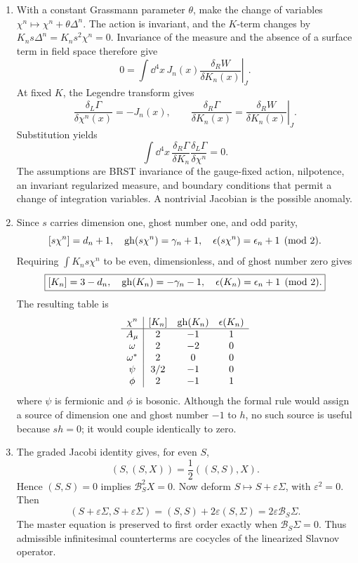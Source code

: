 
\begin{enumerate}
  \begin{enumerate}
    \item[(a)]
    With a constant Grassmann parameter \(\theta\), make the change of
    variables
    \(\chi^n\mapsto\chi^n+\theta\Delta^n\).  The action is invariant,
    and the \(K\)-term changes by
    \(K_n s\Delta^n=K_ns^2\chi^n=0\).  Invariance of the measure and the
    absence of a surface term in field space therefore give
    \[
      0=\int \dd^4x\,J_n(x)
        \left.\frac{\delta_R W}{\delta K_n(x)}\right|_J .
    \]
    At fixed \(K\), the Legendre transform gives
    \[
      \frac{\delta_L\Gamma}{\delta\chi^n(x)}=-J_n(x),
      \qquad
      \frac{\delta_R\Gamma}{\delta K_n(x)}
        =\left.\frac{\delta_R W}{\delta K_n(x)}\right|_J .
    \]
    Substitution yields
    \[
      \boxed{\int \dd^4x\,
        \frac{\delta_R\Gamma}{\delta K_n}
        \frac{\delta_L\Gamma}{\delta\chi^n}=0.}
    \]
    The assumptions are BRST invariance of the gauge-fixed action,
    nilpotence, an invariant regularized measure, and boundary conditions
    that permit a change of integration variables.  A nontrivial Jacobian
    is the possible anomaly.
    \item[(b)]
    Since \(s\) carries dimension one, ghost number one, and odd parity,
    \[
      [s\chi^n]=d_n+1,\quad
      {\rm gh}(s\chi^n)=\gamma_n+1,\quad
      \epsilon(s\chi^n)=\epsilon_n+1\pmod2 .
    \]
    Requiring \(\int K_ns\chi^n\) to be even, dimensionless, and of ghost
    number zero gives
    \[
      \boxed{[K_n]=3-d_n,\quad
      {\rm gh}(K_n)=-\gamma_n-1,\quad
      \epsilon(K_n)=\epsilon_n+1\pmod2 .}
    \]
    The resulting table is
    \[
    \begin{array}{c|ccc}
      \chi^n&[K_n]&{\rm gh}(K_n)&\epsilon(K_n)\\ \hline
      A_\mu&2&-1&1\\
      \omega&2&-2&0\\
      \omega^*&2&0&0\\
      \psi&3/2&-1&0\\
      \phi&2&-1&1
    \end{array}
    \]
    where \(\psi\) is fermionic and \(\phi\) is bosonic.  Although the
    formal rule would assign a source of dimension one and ghost number
    \(-1\) to \(h\), no such source is useful because \(sh=0\); it would
    couple identically to zero.
    \item[(c)]
    The graded Jacobi identity gives, for even \(S\),
    \[
      (S,(S,X))=\frac12((S,S),X).
    \]
    Hence \((S,S)=0\) implies
    \(\mathcal B_S^2X=0\).  Now deform
    \(S\mapsto S+\varepsilon\Sigma\), with \(\varepsilon^2=0\).  Then
    \[
      (S+\varepsilon\Sigma,S+\varepsilon\Sigma)
        =(S,S)+2\varepsilon(S,\Sigma)
        =2\varepsilon\mathcal B_S\Sigma .
    \]
    The master equation is preserved to first order exactly when
    \(\mathcal B_S\Sigma=0\).  Thus admissible infinitesimal counterterms
    are cocycles of the linearized Slavnov operator.
  \end{enumerate}


\end{enumerate}
